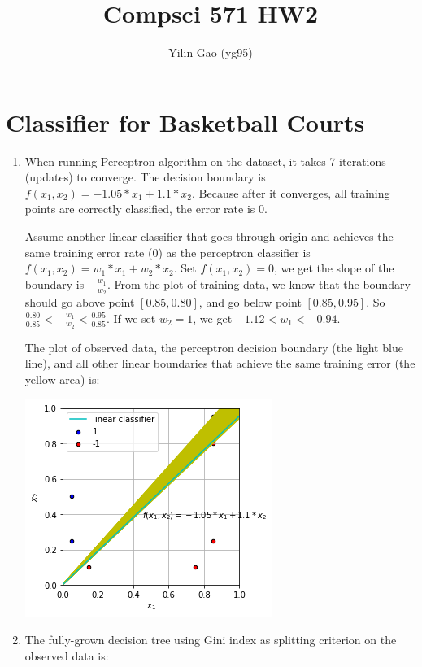 \documentclass[paper=letter, fontsize=12pt]{article}
\title{Compsci 571 HW2}
\author{Yilin Gao (yg95)}
\begin{document}
\maketitle
\section{Classifier for Basketball Courts}

\begin{enumerate}[label=(\alph*)]
	\item When running Perceptron algorithm on the dataset, it takes 7 iterations (updates) to converge. The decision boundary is $f(x_1, x_2) = -1.05 * x_1 + 1.1 * x_2$. Because after it converges, all training points are correctly classified, the error rate is 0.
	
	Assume another linear classifier that goes through origin and achieves the same training error rate (0) as the perceptron classifier is $f(x_1, x_2) = w_1 * x_1 + w_2 * x_2$. Set $f(x_1, x_2) = 0$, we get the slope of the boundary is $-\frac{w_1}{w_2}$. From the plot of training data, we know that the boundary should go above point $[0.85, 0.80]$, and go below point $[0.85, 0.95]$. So $\frac{0.80}{0.85} < -\frac{w_1}{w_2} < \frac{0.95}{0.85}$. If we set $w_2 = 1$, we get $ -1.12< w_1 < -0.94$.
	
	The plot of observed data, the perceptron decision boundary (the light blue line), and all other linear boundaries that achieve the same training error (the yellow area) is:
	
	\includegraphics[scale=0.6]{q1a.png}
	
	\item The fully-grown decision tree using Gini index as splitting criterion on the observed data is:
	

\end{enumerate}
\end{document}
